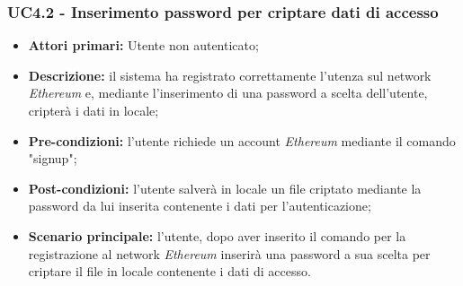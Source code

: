 \subsubsection{UC4.2 - Inserimento password per criptare dati di accesso }
\begin{itemize}
	\item \textbf{Attori primari:} Utente non autenticato;
	\item \textbf{Descrizione:} il sistema ha registrato correttamente l'utenza sul network \textit{Ethereum\glos} e, mediante l'inserimento di una password a scelta dell'utente, cripterà i dati in locale; 
	\item \textbf{Pre-condizioni:} l'utente richiede un account \textit{Ethereum\glo} mediante il comando "signup"; 
	\item \textbf{Post-condizioni:} l'utente salverà in locale un file criptato mediante la password da lui inserita contenente i dati per l'autenticazione;
	\item \textbf{Scenario principale:} l'utente, dopo aver inserito il comando per la registrazione al network \textit{Ethereum\glo} inserirà una password a sua scelta per criptare il file in locale contenente i dati di accesso.
\end{itemize}